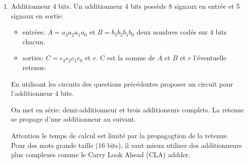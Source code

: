 \documentclass[a4paper,10pt]{exam}
\begin{document}
\begin{enumerate}
\begin{solution}
\end{solution}


\item Additionneur 4 bits. Un additionneur 4 bits possède 8 signaux en entrée et
  5 signaux en sortie:
  \begin{itemize}
    \item entrées: $A=a_3a_2a_1a_0$ et $B=b_3b_2b_1b_0$ deux nombres codés sur
      4 bits chacun.
    \item sorties: $C=c_3c_2c_1c_0$ et $r$. C est la somme de $A$ et $B$ et $r$
      l'éventuelle retenue.
  \end{itemize}
  En utilisant les circuits des questions précédentes proposer un circuit pour
  l'additionneur 4 bits.

\begin{solution}
    On met en série: demi-additionneur et trois additioneurs complets.
    La retenue se propage d'une additionneur au suivant.

    Attention le temps de calcul est limité par la propagagtion de la retenue. Pour des mots grande taille (16 bits), il vaut
    mieux utiliser des additionneurs plus complexes comme le Carry Look Ahead (CLA) addder.
\end{solution}


\end{enumerate}
\end{document}
